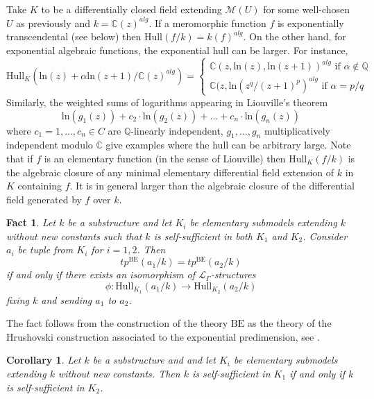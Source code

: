 \documentclass[12pt]{amsart}
\newcommand{\BE}{\mathrm{BE}}
\theoremstyle{definition}
\theoremstyle{plain}
\newtheorem{cor}[defn]{Corollary}
\newtheorem{fact}[defn]{Fact}
\theoremstyle{exampstyle}\newtheorem{thmx}{Theorem}
\theoremstyle{exampstyle}\newtheorem{thmxbis}{Theorem}
\begin{document}
{\exam Take $K$ to be a differentially  closed field extending $\mathcal M(U)$ for some well-chosen $U$ as previously and $k = \mathbb{C}(z)^{alg}$. If a meromorphic function $f$ is exponentially transcendental (see below) then $\mathrm{Hull}(f/k) = k(f)^{alg}$. On the other hand, for exponential algebraic functions, the exponential hull can be larger. For instance,
 $$\mathrm{Hull}_K( \mathrm{ln}(z) + \alpha \mathrm{ln}(z+1)/\mathbb{C}(z)^{alg}) = \begin{cases} \mathbb{C}(z, \mathrm{ln}(z),\mathrm{ln}(z+1))^{alg} \text{ if } \alpha \notin \mathbb{Q} \\ \mathbb{C}(z,\mathrm{ln}(z^q/(z+1)^p)^{alg} \text{ if } \alpha = p/q \end{cases} $$
Similarly, the weighted sums of logarithms appearing in Liouville's theorem \cite{Liouville2}
$$\mathrm{ln}(g_1(z)) + c_2 \cdot \mathrm{ln}(g_2(z)) + \ldots + c_n \cdot \mathrm{ln}(g_n(z)) $$
where $c_1 = 1,\ldots, c_n \in C$ are $\mathbb{Q}$-linearly independent, $g_1,\ldots,g_n$ multiplicatively independent modulo $\mathbb{C}$ give examples where the hull can be arbitrary large. Note that if $f$ is an elementary function (in the sense of Liouville) then $\mathrm{Hull}_K(f/k)$ is the algebraic closure of any minimal elementary differential field extension of $k$ in $K$ containing $f$. It is in general larger than the algebraic closure of the differential field generated by $f$ over $k$.}



\begin{fact} \label{fact-caracterizationoftypes}
Let $k$ be a substructure and let $K_i$ be elementary submodels extending $k$ without new constants such that $k$ is self-sufficient in both $K_1$ and $K_2$. 
Consider $a_i$ be tuple from $K_i$ for $i = 1,2$. Then
$$tp^{\BE}(a_1/k) = tp^{\BE}(a_2/k)$$
if and only if  there exists an isomorphism of $\mathcal L_\Gamma$-structures 
$$\phi: \mathrm{Hull}_{K_1}(a_1/k) \rightarrow \mathrm{Hull}_{K_2}(a_2/k)$$
fixing $k$ and sending $a_1$ to $a_2$.
\end{fact}


The fact follows from the  construction of the theory $\BE$ as the theory of the Hrushovski construction associated to the exponential predimension, see \citep[Theorem 2.22]{Kirby-semiab}. 


\begin{cor} \label{cor-self-sufficient}
Let $k$ be a substructure and and let $K_i$ be elementary submodels extending $k$ without new constants. Then $k$ is self-sufficient in $K_1$ if and only if $k$ is self-sufficient in $K_2$.
\end{cor} 
\end{document}
